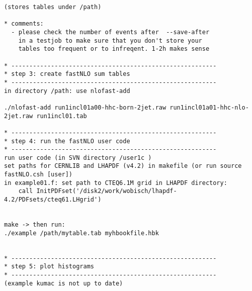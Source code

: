 {\begin{verbatim}
(stores tables under /path)

* comments: 
  - please check the number of events after  --save-after  
    in a testjob to make sure that you don't store your
    tables too frequent or to infreqent. 1-2h makes sense

* ---------------------------------------------------------
* step 3: create fastNLO sum tables
* ---------------------------------------------------------
in directory /path: use nlofast-add

./nlofast-add run1incl01a00-hhc-born-2jet.raw run1incl01a01-hhc-nlo-2jet.raw run1incl01.tab

* ---------------------------------------------------------
* step 4: run the fastNLO user code
* ---------------------------------------------------------
run user code (in SVN directory /user1c )
set paths for CERNLIB and LHAPDF (v4.2) in makefile (or run source fastNLO.csh [user])
in example01.f: set path to CTEQ6.1M grid in LHAPDF directory:
    call InitPDFset('/disk2/work/wobisch/lhapdf-4.2/PDFsets/cteq61.LHgrid')


make -> then run: 
./example /path/mytable.tab myhbookfile.hbk


* ---------------------------------------------------------
* step 5: plot histograms
* ---------------------------------------------------------
(example kumac is not up to date)

\end{verbatim}
}


